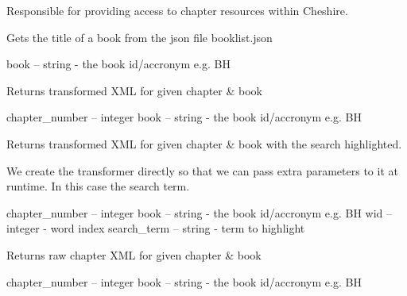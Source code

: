 \documentclass[letterpaper,10pt,english]{sphinxmanual}
\begin{document}
\begin{fulllineitems}
\label{apidoc:chapter_repository.ChapterRepository}
Responsible for providing access to chapter resources within Cheshire.

\begin{fulllineitems}
\label{apidoc:chapter_repository.ChapterRepository.get_book_title}
Gets the title of a book from the json file booklist.json

book -- string - the book id/accronym e.g. BH

\end{fulllineitems}


\begin{fulllineitems}
\label{apidoc:chapter_repository.ChapterRepository.get_chapter}
Returns transformed XML for given chapter \& book

chapter\_number -- integer
book -- string - the book id/accronym e.g. BH

\end{fulllineitems}


\begin{fulllineitems}
\label{apidoc:chapter_repository.ChapterRepository.get_chapter_with_highlighted_search_term}
Returns transformed XML for given chapter \& book with the search
highlighted.

We create the transformer directly so that we can pass extra parameters
to it at runtime. In this case the search term.

chapter\_number -- integer
book -- string - the book id/accronym e.g. BH
wid -- integer - word index
search\_term -- string - term to highlight

\end{fulllineitems}


\begin{fulllineitems}
\label{apidoc:chapter_repository.ChapterRepository.get_raw_chapter}
Returns raw chapter XML for given chapter \& book

chapter\_number -- integer
book -- string - the book id/accronym e.g. BH

\end{fulllineitems}


\end{fulllineitems}
\end{document}
